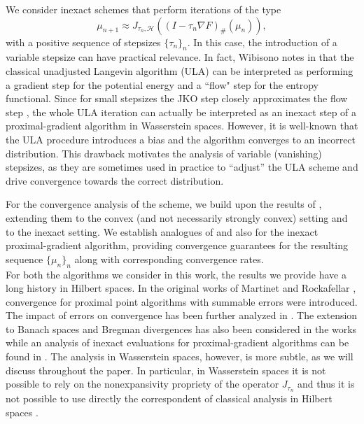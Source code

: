 \documentclass[11pt]{article}
\newcommand{\calH}{\mathcal{H}}
\numberwithin{equation}{section}
\begin{document}
	We consider inexact schemes that perform iterations of the type
	\[\mu_{n+1} \approx J_{\tau_n , \calH}\left((I-\tau_n \nabla F)_{\#}(\mu_n)\right),\]
	with a positive sequence of stepsizes $\{\tau_n\}_{n}$. In this case, the introduction of a variable stepsize can have practical relevance. In fact, Wibisono notes in \cite[Section 2.2.2]{Wibisono18} that the classical unadjusted Langevin algorithm (ULA) can be interpreted as performing a gradient step for the potential energy and a ``flow" step for the entropy functional. Since for small stepsizes the JKO step closely approximates the flow step \cite{AGS08}, the whole ULA iteration can actually be interpreted as an inexact step of a proximal-gradient algorithm in Wasserstein spaces. However, it is well-known that the ULA procedure introduces a bias and the algorithm converges to an incorrect distribution. This drawback motivates the analysis of variable (vanishing) stepsizes, as they are sometimes  used in practice to ``adjust” the ULA scheme and drive convergence towards the correct distribution.
	
	For the convergence analysis of the scheme, we build upon the results of \cite{WPG2020}, extending them  to the convex (and not necessarily strongly convex) setting and to the inexact setting. We establish analogues of  and  also for the inexact proximal-gradient algorithm, providing convergence guarantees for the resulting sequence $\{\mu_n\}_n$ along with corresponding convergence rates.\\
	
	For both the algorithms we consider in this work, the results we provide have a long history in Hilbert spaces. In the original works of Martinet \cite{Martinet72} and Rockafellar \cite{Rockafellar76}, convergence for proximal point algorithms with summable errors were introduced. The impact of errors on convergence has been further analyzed in \cite{Aus87,Gul91,Com97,SolSva00,SolSva01,salzo2012inexact}. The extension to Banach spaces and Bregman divergences has also been considered in the works \cite{AlbBurIus97,Eck98,BurSva01} while an analysis of inexact evaluations for proximal-gradient algorithms can be found in \cite{CombettesWajs2005,Villa2013,Devolder2014}.  The analysis in Wasserstein spaces, however, is more subtle, as we will discuss throughout the paper. In particular, in Wasserstein spaces it is not possible to rely on the nonexpansivity propriety of the operator $J_{\tau_n}$ and thus it is not possible to use directly the correspondent of classical analysis in Hilbert spaces \cite{Combettes2004}.
\end{document}
